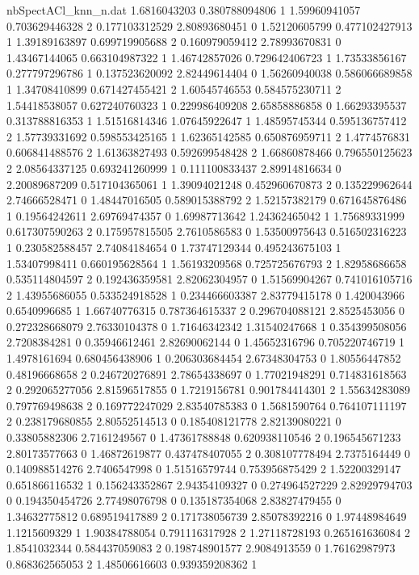 \begin{filecontents}{nbSpectACl_knn_n.dat}
1.6816043203 0.380788094806 1
1.59960941057 0.703629446328 2
0.177103312529 2.80893680451 0
1.52120605799 0.477102427913 1
1.39189163897 0.699719905688 2
0.160979059412 2.78993670831 0
1.43467144065 0.663104987322 1
1.46742857026 0.729642406723 1
1.73533856167 0.277797296786 1
0.137523620092 2.82449614404 0
1.56260940038 0.586066689858 1
1.34708410899 0.671427455421 2
1.60545746553 0.584575230711 2
1.54418538057 0.627240760323 1
0.229986409208 2.65858886858 0
1.66293395537 0.313788816353 1
1.51516814346 1.07645922647 1
1.48595745344 0.595136757412 2
1.57739331692 0.598553425165 1
1.62365142585 0.650876959711 2
1.4774576831 0.606841488576 2
1.61363827493 0.592699548428 2
1.66860878466 0.796550125623 2
2.08564337125 0.693241260999 1
0.111100833437 2.89914816634 0
2.20089687209 0.517104365061 1
1.39094021248 0.452960670873 2
0.135229962644 2.74666528471 0
1.48447016505 0.589015388792 2
1.52157382179 0.671645876486 1
0.19564242611 2.69769474357 0
1.69987713642 1.24362465042 1
1.75689331999 0.617307590263 2
0.175957815505 2.7610586583 0
1.53500975643 0.516502316223 1
0.230582588457 2.74084184654 0
1.73747129344 0.495243675103 1
1.53407998411 0.660195628564 1
1.56193209568 0.725725676793 2
1.82958686658 0.535114804597 2
0.192436359581 2.82062304957 0
1.51569904267 0.741016105716 2
1.43955686055 0.533524918528 1
0.234466603387 2.83779415178 0
1.420043966 0.6540996685 1
1.66740776315 0.787364615337 2
0.296704088121 2.8525453056 0
0.272328668079 2.76330104378 0
1.71646342342 1.31540247668 1
0.354399508056 2.7208384281 0
0.35946612461 2.82690062144 0
1.45652316796 0.705220746719 1
1.4978161694 0.680456438906 1
0.206303684454 2.67348304753 0
1.80556447852 0.48196668658 2
0.246720276891 2.78654338697 0
1.77021948291 0.714831618563 2
0.292065277056 2.81596517855 0
1.7219156781 0.901784414301 2
1.55634283089 0.797769498638 2
0.169772247029 2.83540785383 0
1.5681590764 0.764107111197 2
0.238179680855 2.80552514513 0
0.185408121778 2.82139080221 0
0.33805882306 2.7161249567 0
1.47361788848 0.620938110546 2
0.196545671233 2.80173577663 0
1.46872619877 0.437478407055 2
0.308107778494 2.7375164449 0
0.140988514276 2.7406547998 0
1.51516579744 0.753956875429 2
1.52200329147 0.651866116532 1
0.156243352867 2.94354109327 0
0.274964527229 2.82929794703 0
0.194350454726 2.77498076798 0
0.135187354068 2.83827479455 0
1.34632775812 0.689519417889 2
0.171738056739 2.85078392216 0
1.97448984649 1.1215609329 1
1.90384788054 0.791116317928 2
1.27118728193 0.265161636084 2
1.8541032344 0.584437059083 2
0.198748901577 2.9084913559 0
1.76162987973 0.868362565053 2
1.48506616603 0.939359208362 1

\end{filecontents}
